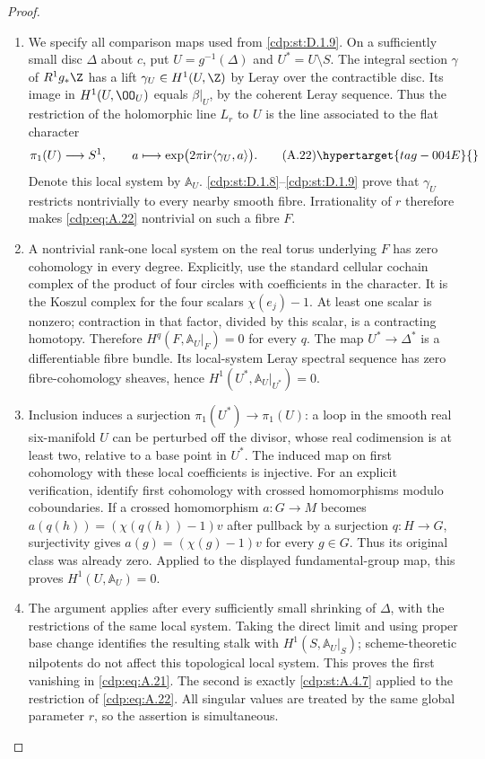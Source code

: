 \begin{proof}

\begin{enumerate}[label={$\langle1\rangle$\arabic*.},leftmargin=*]
\item We specify all comparison maps used from \ref{cdp:st:D.1.9}. On a sufficiently small disc $\Delta$ about $c$, put $U=g^{-1}(\Delta)$ and $U^*=U\setminus S$. The integral section $\gamma$ of $R^1g_*\Z$ has a lift $\gamma_U\in H^1(U,\Z)$ by Leray over the contractible disc. Its image in $H^1(U,\OO_U)$ equals $\beta|_U$, by the coherent Leray sequence. Thus the restriction of the holomorphic line $L_r$ to $U$ is the line associated to the flat character
\[
 \pi_1(U)\longrightarrow S^1,\qquad
 a\longmapsto\exp\bigl(2\pi\mathrm i r\langle\gamma_U,a\rangle\bigr).
 \tag{A.22}\hypertarget{tag-004E}{}\label{cdp:eq:A.22}
\]
Denote this local system by $\mathbb A_U$. \ref{cdp:st:D.1.8}--\ref{cdp:st:D.1.9} prove that $\gamma_U$ restricts nontrivially to every nearby smooth fibre. Irrationality of $r$ therefore makes \eqref{cdp:eq:A.22} nontrivial on such a fibre $F$.

\item A nontrivial rank-one local system on the real torus underlying $F$ has zero cohomology in every degree. Explicitly, use the standard cellular cochain complex of the product of four circles with coefficients in the character. It is the Koszul complex for the four scalars $\chi(e_j)-1$. At least one scalar is nonzero; contraction in that factor, divided by this scalar, is a contracting homotopy. Therefore $H^q(F,\mathbb A_U|_F)=0$ for every $q$. The map $U^*\to\Delta^*$ is a differentiable fibre bundle. Its local-system Leray spectral sequence has zero fibre-cohomology sheaves, hence
$H^1(U^*,\mathbb A_U|_{U^*})=0$.

\item Inclusion induces a surjection $\pi_1(U^*)\to\pi_1(U)$: a loop in the smooth real six-manifold $U$ can be perturbed off the divisor, whose real codimension is at least two, relative to a base point in $U^*$. The induced map on first cohomology with these local coefficients is injective. For an explicit verification, identify first cohomology with crossed homomorphisms modulo coboundaries. If a crossed homomorphism $a:G\to M$ becomes $a(q(h))=(\chi(q(h))-1)v$ after pullback by a surjection $q:H\to G$, surjectivity gives $a(g)=(\chi(g)-1)v$ for every $g\in G$. Thus its original class was already zero. Applied to the displayed fundamental-group map, this proves $H^1(U,\mathbb A_U)=0$.

\item The argument applies after every sufficiently small shrinking of $\Delta$, with the restrictions of the same local system. Taking the direct limit and using proper base change identifies the resulting stalk with $H^1(S,\mathbb A_U|_S)$; scheme-theoretic nilpotents do not affect this topological local system. This proves the first vanishing in \eqref{cdp:eq:A.21}. The second is exactly \ref{cdp:st:A.4.7} applied to the restriction of \eqref{cdp:eq:A.22}. All singular values are treated by the same global parameter $r$, so the assertion is simultaneous.

\end{enumerate}
\end{proof}
